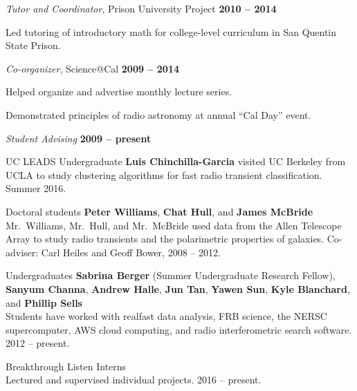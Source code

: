 \documentclass[11pt]{article}
\begin{document}
\begin{outerlist}
\item[] \textit{Tutor and Coordinator}, Prison University Project
    \hfill \textbf{2010 -- 2014}
    \begin{innerlist}
        \item Led tutoring of introductory math for college-level curriculum in San Quentin State Prison.
    \end{innerlist}

\item[] \textit{Co-organizer}, Science@Cal
    \hfill \textbf{2009 -- 2014}
    \begin{innerlist}
        \item Helped organize and advertise monthly lecture series.
        \item Demonstrated principles of radio astronomy at annual ``Cal Day'' event.
    \end{innerlist}

\item[] \textit{Student Advising}
    \hfill \textbf{2009 -- present}
    \begin{innerlist}
      \item UC LEADS Undergraduate \textbf{Luis Chinchilla-Garcia} visited UC Berkeley from UCLA to study clustering algorithms for fast radio transient classification. Summer 2016.
      \item Doctoral students \textbf{Peter Williams}, \textbf{Chat Hull}, and \textbf{James McBride} \\
        Mr.\ Williams, Mr.\ Hull, and Mr.\ McBride used data from the Allen Telescope Array to study radio transients and the polarimetric properties of galaxies. Co-adviser: Carl Heiles and Geoff Bower, 2008 -- 2012.
      \item Undergraduates \textbf{Sabrina Berger} (Summer Undergraduate Research Fellow), \textbf{Sanyum Channa}, \textbf{Andrew Halle}, \textbf{Jun Tan}, \textbf{Yawen Sun}, \textbf{Kyle Blanchard}, and \textbf{Phillip Sells} \\
        Students have worked with realfast data analysis, FRB science, the NERSC supercomputer, AWS cloud computing, and radio interferometric search software.
        2012 -- present.
      \item Breakthrough Listen Interns \\
        Lectured and supervised individual projects. 2016 -- present.
     \end{innerlist}
\end{outerlist}
\end{document}
